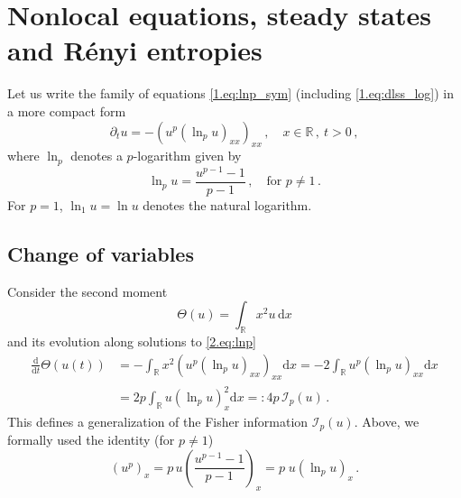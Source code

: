 \documentclass[12pt]{amsart}
\let\pa\partial
\newcommand{\R}{{\mathbb R}}
\newcommand{\dd}{{\mathrm{d}}}
\newcommand{\M}{\Theta}
\newcommand{\I}{\mathcal{I}}
\theoremstyle{plain}
\theoremstyle{definition}
\theoremstyle{remark}
\begin{document}
\section{Nonlocal equations, steady states and R\'enyi entropies}\label{sec:2}

Let us write the family of equations \eqref{1.eq:lnp_sym} (including \eqref{1.eq:dlss_log}) in a more compact form
\begin{equation}\label{2.eq:lnp}
    \pa_t u = -\left(u^p\left(\ln_p u\right)_{xx}\right)_{xx}\,, \quad x\in\R\,,\ t>0\,,
\end{equation}
where $\ln_p$ denotes a $p$-logarithm given by
\begin{equation*}
    \ln_p u = \frac{u^{p-1} - 1}{p-1}\,,\quad \text{for }p\neq 1\,.
\end{equation*}
For $p=1$, $\ln_1 u = \ln u$ denotes the natural logarithm.
\subsection{Change of variables}
Consider the second moment
\begin{equation*}
    \M(u) = \int_\R x^2u\, \dd x
\end{equation*}
and its evolution along solutions to \eqref{2.eq:lnp}
\begin{align*}
    \frac{\dd }{\dd t}\M(u(t)) &= -\int_\R x^2\left(u^p\left(\ln_{p}u\right)_{xx}\right)_{xx} \dd x =
    -2\int_\R u^p \left(\ln_{p}u\right)_{xx} \dd x\\ \nonumber
    &= 2p \int_\R u\left(\ln_{p}u\right)_{x}^2\dd x =: 4p\, \I_p(u)\,.
\end{align*}
This defines a generalization of the Fisher information $\I_p(u)$.
Above, we formally used the identity (for $p\neq 1$)
\begin{equation*}
    (u^p)_x =  p\, u\left(\frac{u^{p-1} - 1}{p-1}\right)_{x} = p\;  u\left(\ln_{p}u\right)_{x}\,.
\end{equation*}
\end{document}
